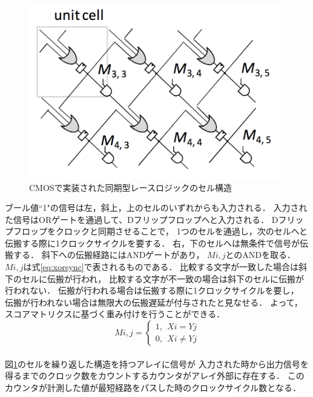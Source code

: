 \begin{itemize}
\begin{figure}[t!]
\begin{center}
\includegraphics[keepaspectratio,scale=0.6]{fig/2/CMOSsync1.png}
\caption{CMOSで実装された同期型レースロジックのセル構造\cite{madhavan2014race}}
\label{fig:CMOSsync}
\end{center}
\end{figure}
ブール値``1"の信号は左，斜上，上のセルのいずれからも入力される．
入力された信号はORゲートを通過して、Dフリップフロップへと入力される．
Dフリップフロップをクロックと同期させることで，
1つのセルを通過し，次のセルへと伝搬する際に1クロックサイクルを要する．
右，下のセルへは無条件で信号が伝搬する．
斜下への伝搬経路にはANDゲートがあり，
$M{i,j}$とのANDを取る．
$M{i,j}$は式\ref{eq:xorsync}で表されるものである．
比較する文字が一致した場合は斜下のセルに伝搬が行われ，
比較する文字が不一致の場合は斜下のセルに伝搬が行われない．
伝搬が行われる場合は伝搬する際に1クロックサイクルを要し，
伝搬が行われない場合は無限大の伝搬遅延が付与されたと見なせる．
よって，スコアマトリクスに基づく重み付けを行うことができる．
\begin{equation}
M{i,j}= \left \{
\begin{array}{l}
1, \ \ X{i}=Y{j}\\
0, \ \ X{i} \neq Y{j}
\end{array}
\right.
\label{eq:xorsync}
\end{equation}
\\
図\ref{fig:CMOSsync}のセルを繰り返した構造を持つアレイに信号が
入力された時から出力信号を得るまでのクロック数をカウントするカウンタがアレイ外部に存在する．
このカウンタが計測した値が最短経路をパスした時のクロックサイクル数となる．


\end{itemize}

